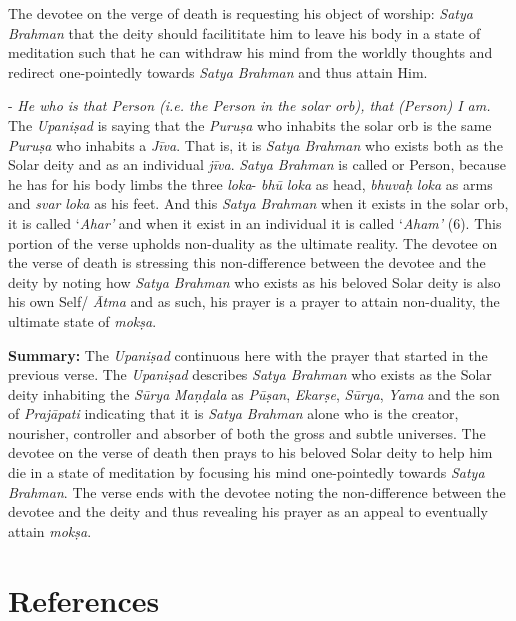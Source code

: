 The devotee on the verge of death is requesting his object of worship: \emph{Satya Brahman} that the deity should facilititate him to leave his body in a state of meditation such that he can withdraw his mind from the worldly thoughts and redirect one-pointedly towards \emph{Satya Brahman} and thus attain Him.

- \emph{He who is that Person (i.e. the Person in the solar orb), that (Person) I am.} The \emph{Upaniṣad} is saying that the \emph{Puruṣa} who inhabits the solar orb is the same \emph{Puruṣa} who inhabits a \emph{Jīva}. That is, it is \emph{Satya Brahman} who exists both as the Solar deity and as an individual \emph{jīva}. \emph{Satya Brahman} is called  or Person, because he has for his body limbs the three \emph{loka}- \emph{bhū} \emph{loka} as head, \emph{bhuvaḥ} \emph{loka} as arms and \emph{svar} \emph{loka} as his feet. And this \emph{Satya Brahman} when it exists in the solar orb, it is called `\emph{Ahar'} and when it exist in an individual it is called `\emph{Aham'} (6). This portion of the verse upholds non-duality as the ultimate reality. The devotee on the verse of death is stressing this non-difference between the devotee and the deity by noting how \emph{Satya Brahman} who exists as his beloved Solar deity is also his own Self/ \emph{Ātma} and as such, his prayer is a prayer to attain non-duality, the ultimate state of \emph{mokṣa}.

\textbf{Summary:} The \emph{Upaniṣad} continuous here with the prayer that started in the previous verse. The \emph{Upaniṣad} describes \emph{Satya Brahman} who exists as the Solar deity inhabiting the \emph{Sūrya} \emph{Maṇḍala} as \emph{Pūṣan}, \emph{Ekarṣe}, \emph{Sūrya}, \emph{Yama} and the son of \emph{Prajāpati} indicating that it is \emph{Satya Brahman} alone who is the creator, nourisher, controller and absorber of both the gross and subtle universes. The devotee on the verse of death then prays to his beloved Solar deity to help him die in a state of meditation by focusing his mind one-pointedly towards \emph{Satya Brahman}. The verse ends with the devotee noting the non-difference between the devotee and the deity and thus revealing his prayer as an appeal to eventually attain \emph{mokṣa}.

\section*{References}

